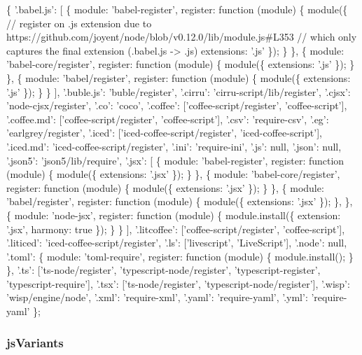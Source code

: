 \begin{DoxyCode}
\{
  '.babel.js': [
    \{
      module: 'babel-register',
      register: function (module) \{
        module(\{
          // register on .js extension due to
       https://github.com/joyent/node/blob/v0.12.0/lib/module.js#L353
          // which only captures the final extension (.babel.js -> .js)
          extensions: '.js'
        \});
      \}
    \},
    \{
      module: 'babel-core/register',
      register: function (module) \{
        module(\{
          extensions: '.js'
        \});
      \}
    \},
    \{
      module: 'babel/register',
      register: function (module) \{
        module(\{
          extensions: '.js'
        \});
      \}
    \}
  ],
  '.buble.js': 'buble/register',
  '.cirru': 'cirru-script/lib/register',
  '.cjsx': 'node-cjsx/register',
  '.co': 'coco',
  '.coffee': ['coffee-script/register', 'coffee-script'],
  '.coffee.md': ['coffee-script/register', 'coffee-script'],
  '.csv': 'require-csv',
  '.eg': 'earlgrey/register',
  '.iced': ['iced-coffee-script/register', 'iced-coffee-script'],
  '.iced.md': 'iced-coffee-script/register',
  '.ini': 'require-ini',
  '.js': null,
  '.json': null,
  '.json5': 'json5/lib/require',
  '.jsx': [
    \{
      module: 'babel-register',
      register: function (module) \{
        module(\{
          extensions: '.jsx'
        \});
      \}
    \},
    \{
      module: 'babel-core/register',
      register: function (module) \{
        module(\{
          extensions: '.jsx'
        \});
      \}
    \},
    \{
      module: 'babel/register',
      register: function (module) \{
        module(\{
          extensions: '.jsx'
        \});
      \},
    \},
    \{
      module: 'node-jsx',
      register: function (module) \{
        module.install(\{
          extension: '.jsx',
          harmony: true
        \});
      \}
    \}
  ],
  '.litcoffee': ['coffee-script/register', 'coffee-script'],
  '.liticed': 'iced-coffee-script/register',
  '.ls': ['livescript', 'LiveScript'],
  '.node': null,
  '.toml': \{
    module: 'toml-require',
    register: function (module) \{
      module.install();
    \}
  \},
  '.ts': ['ts-node/register', 'typescript-node/register', 'typescript-register', 'typescript-require'],
  '.tsx': ['ts-node/register', 'typescript-node/register'],
  '.wisp': 'wisp/engine/node',
  '.xml': 'require-xml',
  '.yaml': 'require-yaml',
  '.yml': 'require-yaml'
\};
\end{DoxyCode}


\subsubsection*{js\+Variants}

